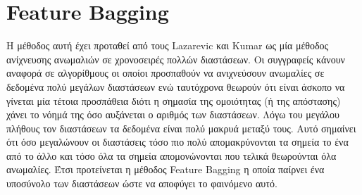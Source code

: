 \documentclass[a4paper,12pt]{report}
\theoremstyle{definitionNODot}
\begin{document}
	\section{Feature Bagging}
	
	H μέθοδος αυτή έχει προταθεί από τους Lazarevic και Kumar \cite{lazarevicKumar2005Featurebagging} ως μία μέθοδος ανίχνευσης ανωμαλιών σε χρονοσειρές πολλών διαστάσεων. Οι συγγραφείς κάνουν αναφορά σε αλγορίθμους οι οποίοι προσπαθούν να ανιχνεύσουν ανωμαλίες σε δεδομένα πολύ μεγάλων διαστάσεων ενώ ταυτόχρονα θεωρούν ότι είναι άσκοπο να γίνεται μία τέτοια προσπάθεια διότι η σημασία της ομοιότητας (ή της απόστασης) χάνει το νόημά της όσο αυξάνεται ο αριθμός των διαστάσεων. Λόγω του μεγάλου πλήθους τον διαστάσεων τα δεδομένα είναι πολύ μακρυά μεταξύ τους. Αυτό σημαίνει ότι όσο μεγαλώνουν οι διαστάσεις τόσο πιο πολύ απομακρύνονται τα σημεία το ένα από το άλλο και τόσο όλα τα σημεία απομονώνονται που τελικά θεωρούνται όλα ανωμαλίες. Έτσι προτείνεται η μέθοδος Feature Bagging η οποία παίρνει ένα υποσύνολο των διαστάσεων ώστε να αποφύγει το φαινόμενο αυτό. 
	
\end{document}
